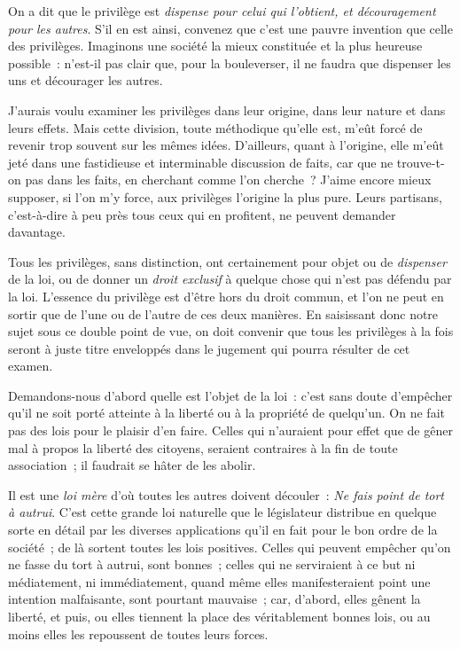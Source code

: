 \documentclass[french,twoside]{book} %
\begin{document}
\noindent On a dit que le privilège est {\itshape dispense pour celui qui l’obtient, et découragement pour les autres}. S’il en est ainsi, convenez que c’est une pauvre invention que celle des privilèges. Imaginons une société la mieux constituée et la plus heureuse possible : n’est-il pas clair que, pour la bouleverser, il ne faudra que dispenser les uns et décourager les autres.\par
J’aurais voulu examiner les privilèges dans leur origine, dans leur nature et dans leurs effets. Mais cette division, toute méthodique qu’elle est, m’eût forcé de revenir trop souvent sur les mêmes idées. D’ailleurs, quant à l’origine, elle m’eût jeté dans une fastidieuse et interminable discussion de faits, car que ne trouve-t-on pas dans les faits, en cherchant comme l’on cherche ? J’aime encore mieux supposer, si l’on m’y force, aux privilèges l’origine la plus pure. Leurs partisans, c’est-à-dire à peu près tous ceux qui en profitent, ne peuvent demander davantage.\par
Tous les privilèges, sans distinction, ont certainement pour objet ou de {\itshape dispenser} de la loi, ou de donner un {\itshape droit exclusif} à quelque chose qui n’est pas défendu par la loi. L’essence du privilège est d’être hors du droit commun, et l’on ne peut en sortir que de l’une ou de l’autre de ces deux manières. En saisissant donc notre sujet sous ce double point de vue, on doit convenir que tous les privilèges à la fois seront à juste titre enveloppés dans le jugement qui pourra résulter de cet examen.\par
Demandons-nous d’abord quelle est l’objet de la loi : c’est sans doute d’empêcher qu’il ne soit porté atteinte à la liberté ou à la propriété de quelqu’un. On ne fait pas des lois pour le plaisir d’en faire. Celles qui n’auraient pour effet que de gêner mal à propos la liberté des citoyens, seraient contraires à la fin de toute association ; il faudrait se hâter de les abolir.\par
Il est une {\itshape loi mère} d’où toutes les autres doivent découler : {\itshape Ne fais point de tort à autrui}. C’est cette grande loi naturelle que le législateur distribue en quelque sorte en détail par les diverses applications qu’il en fait pour le bon ordre de la société ; de là sortent toutes les lois positives. Celles qui peuvent empêcher qu’on ne fasse du tort à autrui, sont bonnes ; celles qui ne serviraient à ce but ni médiatement, ni immédiatement, quand même elles manifesteraient point une intention malfaisante, sont pourtant mauvaise ; car, d’abord, elles gênent la liberté, et puis, ou elles tiennent la place des véritablement bonnes lois, ou au moins elles les repoussent de toutes leurs forces.\par
\end{document}
